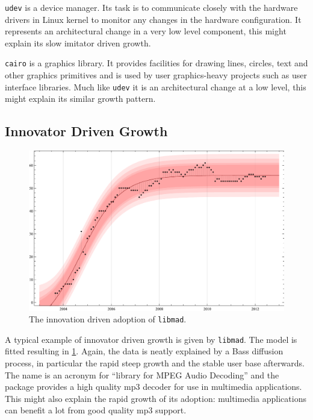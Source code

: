 \documentclass[smallextended,final]{svjour3}
\begin{document}
\verb|udev| is a device manager. Its task is to communicate closely with the hardware drivers in Linux kernel to monitor any changes in the hardware configuration. It represents an architectural change in a very low level component, this might explain its slow imitator driven growth.

\verb|cairo| is a graphics library. It provides facilities for drawing lines, circles, text and other graphics primitives and is used by user graphics-heavy projects such as user interface libraries. Much like \verb|udev| it is an architectural change at a low level, this might explain its similar growth pattern.

\subsection{Innovator Driven Growth}

\begin{figure}
\centering
\includegraphics[width=\linewidth]{BassFit-libmad2.pdf}
\vspace{-2em}
\caption{The innovation driven adoption of \texttt{libmad}.}\label{fig:libmad}
\vspace{-1em}
\end{figure}

A typical example of innovator driven growth is given by \verb|libmad|. The model is fitted resulting in \ref{fig:libmad}. Again, the data is neatly explained by a Bass diffusion process, in particular the rapid steep growth and the stable user base afterwards. The name is an acronym for ``library for MPEG Audio Decoding'' and the package provides a high quality mp3 decoder for use in multimedia applications. This might also explain the rapid growth of its adoption: multimedia applications can benefit a lot from good quality mp3 support.
\end{document}
